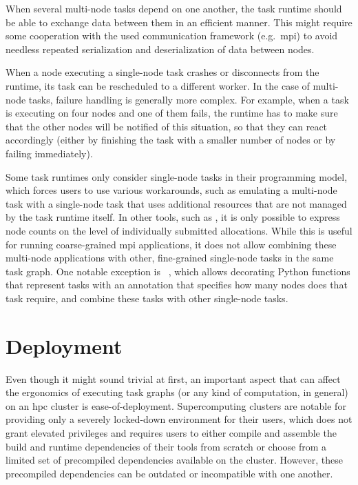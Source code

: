 \begin{description}[wide=0pt]
		When several multi-node tasks depend on one another, the task runtime should be able to exchange
		data between them in an efficient manner. This might require some cooperation with the used
		communication framework (e.g.\ \gls{mpi}) to avoid needless repeated serialization and
		deserialization of data between nodes.
	\item[Fault tolerance] When a node executing a single-node task crashes or disconnects from the runtime, its task can be
		rescheduled to a different worker. In the case of multi-node tasks, failure handling is generally
		more complex. For example, when a task is executing on four nodes and one of them fails, the
		runtime has to make sure that the other nodes will be notified of this situation, so that they can
		react accordingly (either by finishing the task with a smaller number of nodes or by failing
		immediately).
\end{description}

Some task runtimes only consider single-node tasks in their programming model, which forces users
to use various workarounds, such as emulating a multi-node task with a single-node task that uses
additional resources that are not managed by the task runtime itself. In other tools, such as
\autosubmit{}, it is only possible to express node counts on the level of individually
submitted allocations. While this is useful for running coarse-grained \gls{mpi}
applications, it does not allow combining these multi-node applications with other, fine-grained
single-node tasks in the same task graph. One notable exception is
\pycompss{}~\cite{pycompss}, which allows decorating Python functions that
represent tasks with an annotation that specifies how many nodes does that task require, and
combine these tasks with other single-node tasks.


\section{Deployment}
\label{challenge:deployment}
Even though it might sound trivial at first, an important aspect that can affect the ergonomics of
executing task graphs (or any kind of computation, in general) on an \gls{hpc}
cluster is ease-of-deployment. Supercomputing clusters are notable for providing only a severely
locked-down environment for their users, which does not grant elevated privileges and requires
users to either compile and assemble the build and runtime dependencies of their tools from scratch
or choose from a limited set of precompiled dependencies available on the cluster. However, these
precompiled dependencies can be outdated or incompatible with one another.

